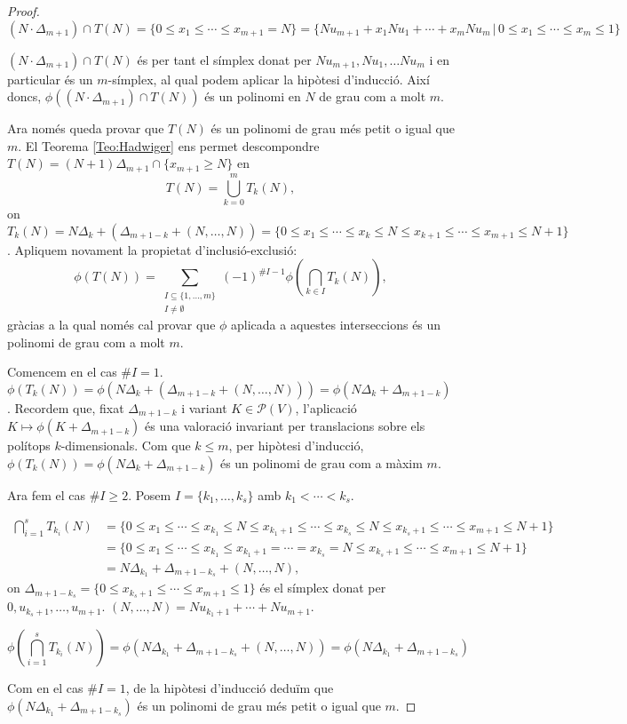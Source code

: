 \documentclass{article}
\theoremstyle{definition}
\begin{document}
\begin{proof}
\[(N\cdot\Delta_{m+1})\cap T(N)=\{0\leq x_1\leq\cdots\leq x_{m+1}=N\}=\{Nu_{m+1}+x_1Nu_1+\cdots+x_mNu_m\,|\,0\leq x_1\leq\cdots\leq x_m\leq1\}\]

$(N\cdot\Delta_{m+1})\cap T(N)$ \'{e}s per tant el s\'{i}mplex donat per $Nu_{m+1},Nu_1,\ldots Nu_m$ i en particular \'{e}s un $m$-s\'{i}mplex, al qual podem aplicar la hip\`{o}tesi d'inducci\'{o}. Aix\'{i} doncs, $\phi((N\cdot\Delta_{m+1})\cap T(N))$ \'{e}s un polinomi en $N$ de grau com a molt $m$.

Ara nom\'{e}s queda provar que $T(N)$ \'{e}s un polinomi de grau m\'{e}s petit o igual que $m$. El Teorema \ref{Teo:Hadwiger} ens permet descompondre $T(N)=(N+1)\Delta_{m+1}\cap\{x_{m+1}\geq N\}$ en
\[T(N)=\bigcup_{k=0}^mT_k(N),\]
on $T_k(N)=N\Delta_k+(\Delta_{m+1-k}+(N,\ldots,N))=\{0\leq x_1\leq\cdots\leq x_k\leq N\leq x_{k+1}\leq\cdots\leq x_{m+1}\leq N+1\}$. Apliquem novament la propietat d'inclusi\'{o}-exclusi\'{o}:
\[\phi(T(N))=\sum_{\substack{I\subseteq\{1,\ldots,m\}\\I\neq\emptyset}}(-1)^{\#I-1}\phi\left(\bigcap_{k\in I}T_k(N)\right),\]
gr\`{a}cias a la qual nom\'{e}s cal provar que $\phi$ aplicada a aquestes interseccions \'{e}s un polinomi de grau com a molt $m$. 

Comencem en el cas $\#I=1$. $\phi(T_k(N))=\phi(N\Delta_k+(\Delta_{m+1-k}+(N,\ldots,N)))=\phi(N\Delta_k+\Delta_{m+1-k})$. Recordem que, fixat $\Delta_{m+1-k}$ i variant $K\in\mathcal{P}(V)$, l'aplicaci\'{o} $K\mapsto\phi(K+\Delta_{m+1-k})$ \'{e}s una valoraci\'{o} invariant per translacions sobre els pol\'{i}tops $k$-dimensionals. Com que $k\leq m$, per hip\`{o}tesi d'inducci\'{o}, $\phi(T_k(N))=\phi(N\Delta_k+\Delta_{m+1-k})$ \'{e}s un polinomi de grau com a m\`{a}xim $m$.

Ara fem el cas $\#I\geq2$. Posem $I=\{k_1,\ldots,k_s\}$ amb $k_1<\cdots<k_s$.

\begin{align*}
\bigcap_{i=1}^sT_{k_i}(N)&=\{0\leq x_1\leq\cdots\leq x_{k_1}\leq N\leq x_{k_1+1}\leq\cdots\leq x_{k_s}\leq N\leq x_{k_s+1}\leq\cdots\leq x_{m+1}\leq N+1\}\\
&=\{0\leq x_1\leq\cdots\leq x_{k_1}\leq x_{k_1+1}=\cdots=x_{k_s}=N\leq x_{k_s+1}\leq\cdots\leq x_{m+1}\leq N+1\}\\
&=N\Delta_{k_1}+\Delta_{m+1-k_s}+(N,\ldots,N),
\end{align*}
on $\Delta_{m+1-k_s}=\{0\leq x_{k_s+1}\leq\cdots\leq x_{m+1}\leq1\}$ \'{e}s el s\'{i}mplex donat per $0,u_{k_s+1},\ldots,u_{m+1}$. $(N,\ldots,N)=Nu_{k_1+1}+\cdots+Nu_{m+1}$.

\[\phi\left(\bigcap_{i=1}^sT_{k_i}(N)\right)=\phi(N\Delta_{k_1}+\Delta_{m+1-k_s}+(N,\ldots,N))=\phi(N\Delta_{k_1}+\Delta_{m+1-k_s})\]

Com en el cas $\#I=1$, de la hip\`{o}tesi d'inducci\'{o} dedu\"{i}m que $\phi(N\Delta_{k_1}+\Delta_{m+1-k_s})$ \'{e}s un polinomi de grau m\'{e}s petit o igual que $m$.
\end{proof}
\end{document}
